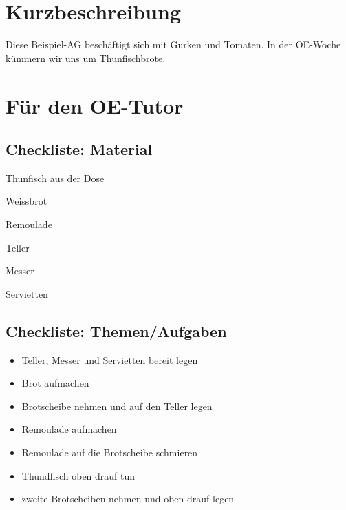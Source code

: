 \documentclass[a4paper,11pt]{scrartcl} %
\newenvironment{myitemize}{\begin{itemize}\itemsep -2pt}{\end{itemize}} %
\begin{document}
\thispagestyle{firststyle}

\begin{wrapfigure}{r}{130pt}
\vspace{-78pt}
  \fbox{
  \begin{minipage}{140pt}
   \tableofcontents
  \end{minipage}
  }
\end{wrapfigure}

\section{Kurzbeschreibung} %
    Diese Beispiel-AG beschäftigt sich mit Gurken und Tomaten. 
    In der OE-Woche kümmern wir uns um Thunfischbrote. 
    
\section{Für den OE-Tutor}
  \subsection{Checkliste: Material} %
    \begin{multicols}{2}[]
      \begin{myitemize}
      \begin{raggedright}
	\item[\Square] Thunfisch aus der Dose
	\item[\Square] Weissbrot
	\item[\Square] Remoulade
	\item[\Square] Teller
	\item[\Square] Messer
	\item[\Square] Servietten
      \end{raggedright}
      \end{myitemize}
    \end{multicols}
  \subsection{Checkliste: Themen/Aufgaben} %
      \begin{myitemize}
	\item[\Square] Teller, Messer und Servietten bereit legen
	\item[\Square] Brot aufmachen
	\item[\Square] Brotscheibe nehmen und auf den Teller legen
	\item[\Square] Remoulade aufmachen
	\item[\Square] Remoulade auf die Brotscheibe schmieren
	\item[\Square] Thundfisch oben drauf tun
	\item[\Square] zweite Brotscheiben nehmen und oben drauf legen
      \end{myitemize}
\end{document}
